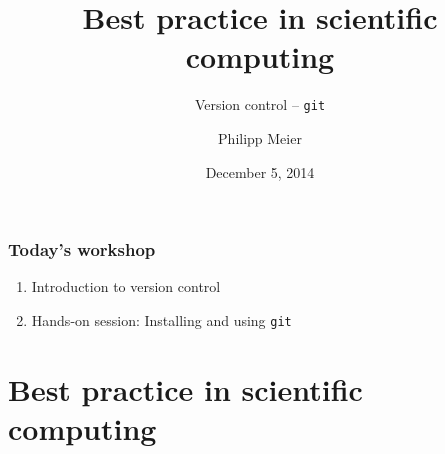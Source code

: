 \documentclass{beamer}
\title{Best practice in scientific computing}
\subtitle{Version control -- \texttt{git}}
\author[P.\ Meier]{Philipp Meier}
\date{December 5, 2014}
\institute[EAWAG]{Eawag: Swiss Federal Institute of Aquatic Science and Technology}
\begin{document}
\begin{frame}[t,plain]
\titlepage
\end{frame}


\begin{frame}
    \frametitle{Today's workshop}
    \begin{enumerate}
        \item Introduction to version control
        \item Hands-on session: Installing and using \texttt{git}
    \end{enumerate}
\end{frame}

\section[Best practice]{Best practice in scientific computing}

\newlength{\blockheight}
\setlength{\blockheight}{22mm}
\end{document}
